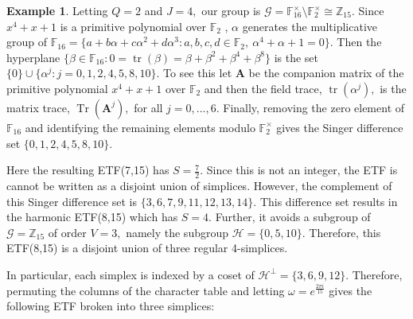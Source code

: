 \documentclass[3p,11pt]{elsarticle}
\newcommand{\bbF}{\mathbb{F}}
\newcommand{\bbZ}{\mathbb{Z}}
\newcommand{\bfA}{\mathbf{A}}
\newcommand{\calG}{\mathcal{G}}
\newcommand{\calH}{\mathcal{H}}
\newcommand{\Tr}{\operatorname{Tr}}
\newcommand{\tr}{\operatorname{tr}}
\theoremstyle{definition}
\newtheorem{example}[theorem]{Example}
\begin{document}
\begin{example}
Letting $Q=2$ and $J=4,$ our group is $\calG=\bbF_{16}^\times\setminus\bbF_2^\times\cong\bbZ_{15}.$ Since $x^4+x+1$ is a primitive polynomial over $\bbF_{2}$ \cite{HansenM92}, $\alpha$ generates the multiplicative group of $\bbF_{16}=\{a+b\alpha+c\alpha^2+d\alpha^3:a,b,c,d\in\bbF_2,~\alpha^4+\alpha+1=0\}.$ Then the hyperplane $\{\beta\in\bbF_{16}:0=\tr(\beta)=\beta+\beta^2+\beta^4+\beta^8\}$ is the set $\{0\}\cup\{\alpha^j:j=0,1,2,4,5,8,10\}.$ To see this let $\bfA$ be the companion matrix of the primitive polynomial $x^4+x+1$ over $\bbF_2$ and then the field trace, $\tr(\alpha^j),$ is the matrix trace, $\Tr(\bfA^j),$ for all $j=0,...,6.$ Finally, removing the zero element of $\bbF_{16}$ and identifying the remaining elements modulo $\bbF_2^\times$ gives the Singer difference set $\{0,1,2,4,5,8,10\}.$

Here the resulting ETF(7,15) has $S=\tfrac{7}{2}.$ Since this is not an integer, the ETF is cannot be written as a disjoint union of simplices. However, the complement of this Singer difference set is $\{3,6,7,9,11,12,13,14\}.$ This difference set results in the harmonic ETF(8,15) which has $S=4.$ Further, it avoids a subgroup of $\calG=\bbZ_{15}$ of order $V=3,$ namely the subgroup $\calH=\{0,5,10\}.$ Therefore, this ETF(8,15) is a disjoint union of three regular 4-simplices.

In particular, each simplex is indexed by a coset of $\calH^\perp=\{3,6,9,12\}.$ Therefore, permuting the columns of the character table and letting $\omega=e^\tfrac{2\pi i}{15}$ gives the following ETF broken into three simplices:


\end{example}
\end{document}
